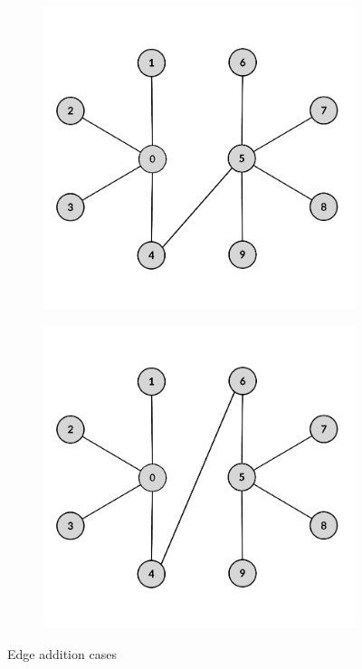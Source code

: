 \begin{figure}[t]
\begin{subfigure}[t]{0.3\textwidth}
		\caption{}
		\label{subfig:starC}
	\end{subfigure}
	\hfill
	\begin{subfigure}[t]{0.3\textwidth}
		\centering
		\includegraphics[height=0.15\textheight]{Figures/starD}
		\caption{}
		\label{subfig:starD}
	\end{subfigure}
	\begin{subfigure}[t]{0.3\textwidth}
		\centering
		\includegraphics[height=0.15\textheight]{Figures/starE}
		\caption{}
		\label{subfig:starE}
	\end{subfigure}
	\caption{Edge addition cases}
	\label{fig:edgeCases}
\end{figure}



